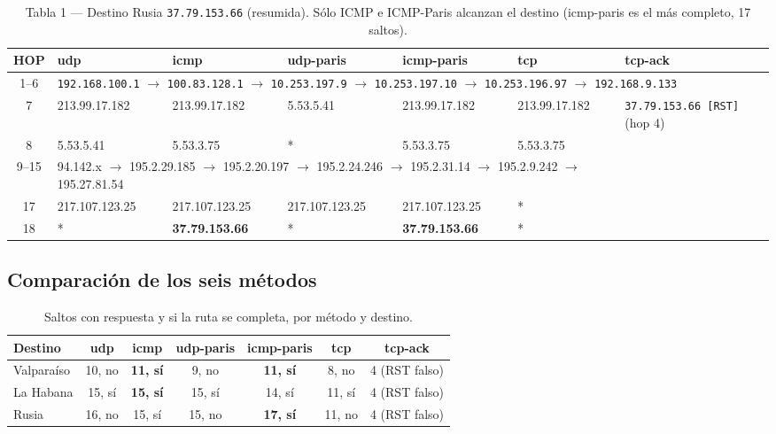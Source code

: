 \documentclass[11pt,a4paper]{article}
\newcommand{\ip}[1]{\texttt{#1}}
\begin{document}
\begin{landscape}
\begin{table}[H]
\centering\scriptsize
\begin{tabular}{c|llllll}
\toprule
HOP & udp & icmp & udp-paris & icmp-paris & tcp & tcp-ack \\
\midrule
1--6 & \multicolumn{6}{l}{\ip{192.168.100.1} $\to$ \ip{100.83.128.1} $\to$ \ip{10.253.197.9} $\to$ \ip{10.253.197.10} $\to$ \ip{10.253.196.97} $\to$ \ip{192.168.9.133}} \\
7 & 213.99.17.182 & 213.99.17.182 & 5.53.5.41 & 213.99.17.182 & 213.99.17.182 & \ip{37.79.153.66 [RST]} (hop 4) \\
8 & 5.53.5.41 & 5.53.3.75 & * & 5.53.3.75 & 5.53.3.75 & \\
9--15 & \multicolumn{5}{l}{94.142.x $\to$ 195.2.29.185 $\to$ 195.2.20.197 $\to$ 195.2.24.246 $\to$ 195.2.31.14 $\to$ 195.2.9.242 $\to$ 195.27.81.54} & \\
17 & 217.107.123.25 & 217.107.123.25 & 217.107.123.25 & 217.107.123.25 & * & \\
18 & * & \textbf{37.79.153.66} & * & \textbf{37.79.153.66} & * & \\
\bottomrule
\end{tabular}
\caption{Tabla 1 --- Destino Rusia \ip{37.79.153.66} (resumida). Sólo ICMP e ICMP-Paris alcanzan
el destino (icmp-paris es el más completo, 17 saltos).}
\end{table}
\end{landscape}

\subsection{Comparación de los seis métodos}
\begin{table}[H]
\centering\small
\begin{tabular}{lcccccc}
\toprule
Destino & udp & icmp & udp-paris & icmp-paris & tcp & tcp-ack \\
\midrule
Valparaíso & 10, no & \textbf{11, sí} & 9, no & \textbf{11, sí} & 8, no & 4 (RST falso) \\
La Habana & 15, sí & \textbf{15, sí} & 15, sí & 14, sí & 11, sí & 4 (RST falso) \\
Rusia & 16, no & 15, sí & 15, no & \textbf{17, sí} & 11, no & 4 (RST falso) \\
\bottomrule
\end{tabular}
\caption{Saltos con respuesta y si la ruta se completa, por método y destino.}
\end{table}
\end{document}
